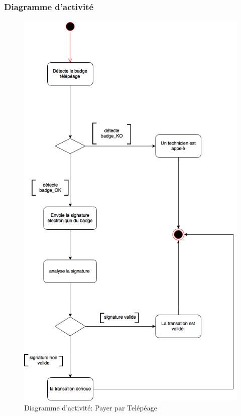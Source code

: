 \subsubsection{Diagramme d'activité}
\begin{figure}[h]
    \centering
    \includegraphics[scale=0.41]{02_Desenvolvimento/TD2/images/DATelepeage.png}
    \caption{Diagramme d'activité: Payer par Telépéage}
\end{figure}
\newpage

